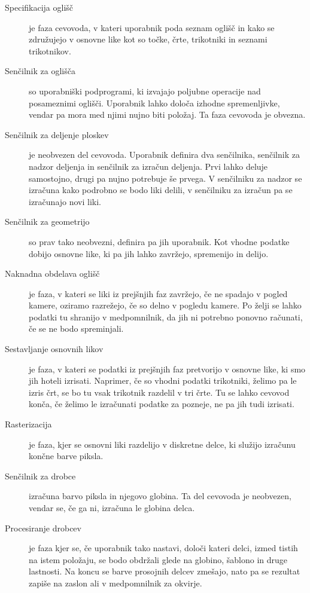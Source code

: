 \documentclass[a4paper, 12pt]{book}
\begin{document}
\begin{description}
\item [Specifikacija oglišč] je faza cevovoda, v kateri uporabnik poda seznam oglišč in kako se združujejo v osnovne like kot so točke, črte, trikotniki in seznami trikotnikov.
\item [Senčilnik za oglišča] so uporabniški podprogrami, ki izvajajo poljubne operacije nad posameznimi oglišči. Uporabnik lahko določa izhodne spremenljivke, vendar pa mora med njimi nujno biti položaj. Ta faza cevovoda je obvezna.
\item [Senčilnik za deljenje ploskev] je neobvezen del cevovoda. Uporabnik definira dva senčilnika, senčilnik za nadzor deljenja in senčilnik za izračun deljenja. Prvi lahko deluje samostojno, drugi pa nujno potrebuje še prvega. V senčilniku za nadzor se izračuna kako podrobno se bodo liki delili, v senčilniku za izračun pa se izračunajo novi liki.

\item [Senčilnik za geometrijo] so prav tako neobvezni, definira pa jih uporabnik. Kot vhodne podatke dobijo osnovne like, ki pa jih lahko zavržejo, spremenijo in delijo.

\item [Naknadna obdelava oglišč] je faza, v kateri se liki iz prejšnjih faz zavržejo, če ne spadajo v pogled kamere, oziramo razrežejo, če so delno v pogledu kamere. Po želji se lahko podatki tu shranijo v medpomnilnik, da jih ni potrebno ponovno računati, če se ne bodo spreminjali.
\item [Sestavljanje osnovnih likov] je faza, v kateri se podatki iz prejšnjih faz pretvorijo v osnovne like, ki smo jih hoteli izrisati. Naprimer, če so vhodni podatki trikotniki, želimo pa le izris črt, se bo tu vsak trikotnik razdelil v tri črte. Tu se lahko cevovod konča, če želimo le izračunati podatke za pozneje, ne pa jih tudi izrisati. 
\item [Rasterizacija] je faza, kjer se osnovni liki razdelijo v diskretne delce, ki služijo izračunu končne barve piksla.
\item [Senčilnik za drobce]izračuna barvo piksla in njegovo globina. Ta del cevovoda je neobvezen, vendar se, če ga ni, izračuna le globina delca.
\item [Procesiranje drobcev] je faza kjer se, če uporabnik tako nastavi, določi kateri delci, izmed tistih na istem položaju, se bodo obdržali glede na globino, šablono in druge lastnosti. Na koncu se barve prosojnih delcev zmešajo, nato pa se rezultat zapiše na zaslon ali v medpomnilnik za okvirje.
\end{description}
\end{document}
